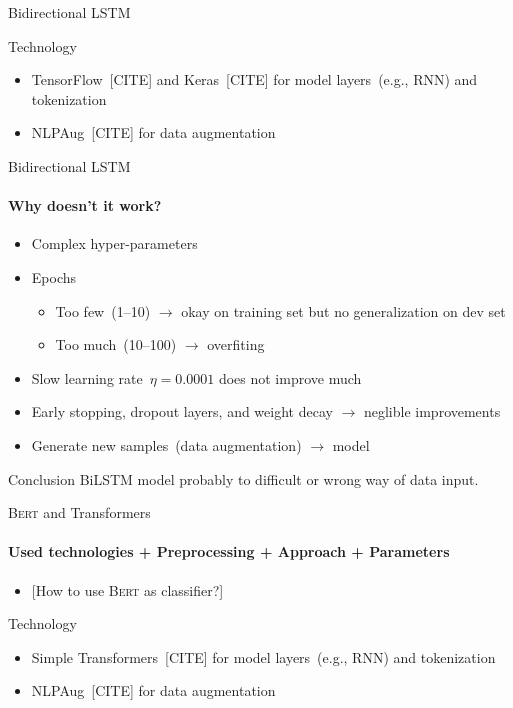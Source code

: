 \documentclass[english,handout]{mlutalk}
\newcommand{\BiLSTM}{\mbox{BiLSTM}\xspace}
\newcommand{\Bert}{\textsc{Bert}\xspace}
\newcommand{\todocite}{{\smaller\color{red}[CITE]}\xspace}
\newcommand{\todo}[1]{{\smaller\color{red}[#1]}}
\begin{document}
\begin{frame}[allowframebreaks]{Bidirectional LSTM}
  \begin{block}{Technology}
      \begin{itemize}
        \item TensorFlow~\todocite and Keras~\todocite for model layers~(e.g., RNN) and tokenization
        \item NLPAug~\todocite for data augmentation
      \end{itemize}
  \end{block}

\end{frame}

\begin{frame}{Bidirectional LSTM}
  \framesubtitle{Why doesn't it work?}

  \begin{itemize}
    \item Complex hyper-parameters
    \item Epochs
    \begin{itemize}
      \item Too few~(1--10) \(\to\) okay on training set but no generalization on dev set
      \item Too much~(10--100) \(\to\) overfiting
    \end{itemize}
    \item Slow learning rate~\(\eta = 0.0001\) does not improve much
    \item Early stopping, dropout layers, and weight decay \(\to\) neglible improvements
    \item Generate new samples~(data augmentation) \(\to\)  model
  \end{itemize}

  \begin{block}{Conclusion}
    \BiLSTM model probably to difficult or wrong way of data input.
  \end{block}

\end{frame}

\begin{frame}{\Bert and Transformers}
  \framesubtitle{Used technologies + Preprocessing + Approach + Parameters}

  \begin{itemize}
    \item \todo{How to use \Bert as classifier?}
  \end{itemize}
  
  \begin{block}{Technology}
    \begin{itemize}
      \item Simple Transformers~\todocite for model layers~(e.g., RNN) and tokenization
      \item NLPAug~\todocite for data augmentation
    \end{itemize}
  \end{block}

\end{frame}
\end{document}
